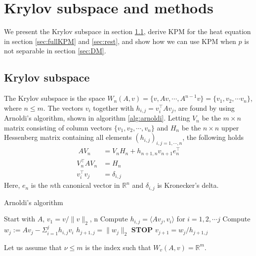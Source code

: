 \chapter{Krylov subspace and methods}%
We present the Krylov subspace in section \ref{sec:subspace}, derive KPM for the heat equation in section \ref{sec:fullKPM} and \ref{sec:rest}, and show how we can use KPM when $p$ is not separable in section \ref{sec:DM}.
\label{sec:krylov}

\section{Krylov subspace} \label{sec:subspace}
The Krylov subspace is the space $W_n (A,v) = \{v,Av, \cdots, A^{n-1}v\} = \{v_1,v_2,\cdots v_n\} $, where $n \leq m$. %
The vectors $v_i$ together with $h_{i,j} = v_i^\top Av_j$, are found by using Arnoldi's algorithm, shown in algorithm \ref{alg:arnoldi}. Letting $V_n$ be the $m \times n$ matrix consisting of column vectors $\{v_1,v_2,\cdots,v_n \}$ and $H_n$ be the $n \times n$ upper Hessenberg matrix containing all elements $(h_{i,j})_{i,j=1,\cdots,n}$, the following holds \cite{krylovprop}
\begin{align}\
AV_n & = V_n H_n + h_{n+1,n}v_{n+1}e^\top_n \label{eqn:prop1} \\
V^{\top}_n AV_n &= H_n \label{eqn:prop2} \\
v_i^{\top} v_j &= \delta_{i,j} \label{eqn:prop3}
\end{align}
Here, $e_n$ is the $n$th canonical vector in $\mathbb{R}^n$ and $\delta_{i,j}$ is Kronecker's delta.\\




\begin{algorithm} 
\begin{algorithmic} \caption{Arnoldi's algorithm\cite{arnold}} \label{alg:arnoldi}  
\STATE Start with $A$, $v_1 = v/\|v \|_2$, n
   \STATE Compute $h_{i,j} = \langle Av_j,v_i \rangle $ for $i = 1,2,\cdots j$
    \STATE Compute $w_j := A v_j - \Sigma_{i=1}^{j} h_{i,j}v_i $
    \STATE $h_{j+1,j} = \| w_j \|_2$
        \STATE\textbf{STOP}
    \ENDIF 
   \STATE $v_{j+1} = w_j/h_{j+1,j}$
\ENDFOR
\end{algorithmic} 
\end{algorithm}
Let us assume that $\nu \leq m$ is the index such that $W_v(A,v)=\mathbb{R}^m$.
